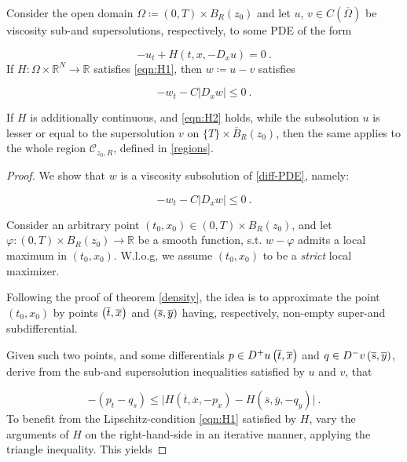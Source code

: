 \begin{theorem}
	\label{viscosity_loc}
	Consider the open domain $ \Omega \coloneqq \left( 0, T \right) \times B_R(z_0) $ and let $ u $, $ v \in C(\overline{\Omega}) $ be viscosity sub-and supersolutions, respectively, to some PDE of the form
	
	\begin{equation*}
	-u_t + H(t, x, -D_x u) = 0 \ .
	\end{equation*}
	If $ H : \Omega \times \mathbb{R}^{N} \to \mathbb{R} $ satisfies \eqref{eqn:H1}, then $ w \coloneqq u - v $ satisfies
	
	\begin{equation*}
	-w_t - C \lvert D_x w \rvert \leq 0 \ .
	\end{equation*}
	
	If $ H $ is additionally continuous, and \eqref{eqn:H2} holds, while the subsolution $ u $ is lesser or equal to the supersolution $ v $ on $ \{ T \} \times \overline{B}_R (z_0) $, then the same applies to the whole region $ \mathcal{C}_{z_0, R} $, defined in \ref{regions}.
		  	\begin{proof}
		  		We show that $ w $ is a viscosity subsolution of \eqref{diff-PDE}, namely:
		  		
		  		\begin{equation*}
		  			-w_t - C \lvert D_x w \rvert \leq 0 \ .
		  		\end{equation*}
		  		
		  		Consider an arbitrary point $ (t_0, x_0) \in \left( 0, T \right) \times B_R(z_0) $, and let $ \varphi : \left( 0, T \right) \times B_R(z_0) \to \mathbb{R} $ be a smooth function, s.t. $ w - \varphi $ admits a local maximum in $ (t_0, x_0) $. W.l.o.g, we assume $ (t_0, x_0) $ to be a \emph{strict} local maximizer.
		  		
		  		Following the proof of theorem \ref{density}, the idea is to approximate the point $ (t_0, x_0) $ by points $ \left(\overline{t}, \overline{x}\right) $ and $ \left(\overline{s}, \overline{y}\right) $ having, respectively, non-empty super-and subdifferential.
		  		
		  		Given such two points, and some differentials $ p \in D^{+} u \left(\overline{t}, \overline{x}\right) $ and $ q \in D^{-} v \left(\overline{s}, \overline{y}\right) $, derive from the sub-and supersolution inequalities satisfied by $ u $ and $ v $, that
		  		
		  		\begin{equation*}
		  		-(p_t - q_s) \leq \lvert H(\overline{t}, \overline{x}, -p_x) - H(\overline{s}, \overline{y}, -q_y) \rvert \ .
		  		\end{equation*}
		  		To benefit from the Lipschitz-condition \eqref{eqn:H1} satisfied by $ H $, vary the arguments of $ H $ on the right-hand-side in an iterative manner, applying the triangle inequality. This yields
		  		

\end{proof}
\end{theorem}
